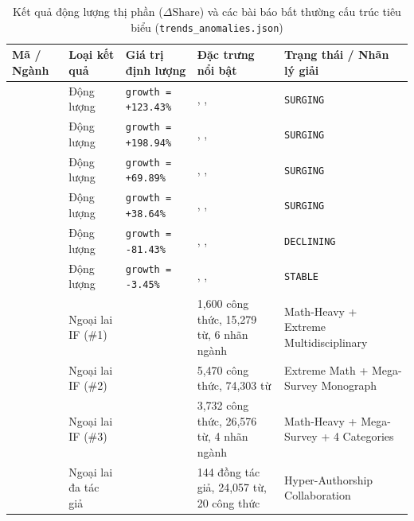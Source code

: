 \begin{table}[!htbp]
\centering
\footnotesize
\setlength{\tabcolsep}{3pt}
\caption[Kết quả động lượng thị phần và bất thường Isolation Forest]{Kết quả động lượng thị phần (\texorpdfstring{$\Delta\text{Share}$}{Delta Share}) và các bài báo bất thường cấu trúc tiêu biểu (\texttt{trends\_anomalies.json})}
\label{tab:anomalies}
\begin{tabularx}{\linewidth}{|>{\raggedright\arraybackslash}p{24mm}|>{\raggedright\arraybackslash}p{22mm}|>{\centering\arraybackslash}p{24mm}|L|>{\raggedright\arraybackslash}p{34mm}|}
\hline
\textbf{Mã / Ngành} & \textbf{Loại kết quả} & \textbf{Giá trị định lượng} & \textbf{Đặc trưng nổi bật} & \textbf{Trạng thái / Nhãn lý giải} \\ \hline
{} & Động lượng & \texttt{growth = +123.43\%} & , ,  & \texttt{SURGING} \\ \hline
{} & Động lượng & \texttt{growth = +198.94\%} & , ,  & \texttt{SURGING} \\ \hline
{} & Động lượng & \texttt{growth = +69.89\%} & , ,  & \texttt{SURGING} \\ \hline
{} & Động lượng & \texttt{growth = +38.64\%} & , ,  & \texttt{SURGING} \\ \hline
{} & Động lượng & \texttt{growth = -81.43\%} & , ,  & \texttt{DECLINING} \\ \hline
{} & Động lượng & \texttt{growth = -3.45\%} & , ,  & \texttt{STABLE} \\ \hline
{} & Ngoại lai IF (\#1) &  & 1,600 công thức, 15,279 từ, 6 nhãn ngành & Math-Heavy + Extreme Multidisciplinary \\ \hline
{} & Ngoại lai IF (\#2) &  & 5,470 công thức, 74,303 từ & Extreme Math + Mega-Survey Monograph \\ \hline
{} & Ngoại lai IF (\#3) &  & 3,732 công thức, 26,576 từ, 4 nhãn ngành & Math-Heavy + Mega-Survey + 4 Categories \\ \hline
{} & Ngoại lai đa tác giả &  & 144 đồng tác giả, 24,057 từ, 20 công thức & Hyper-Authorship Collaboration \\ \hline
\end{tabularx}
\end{table}
